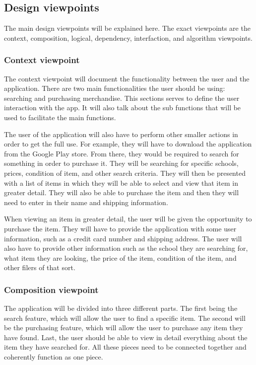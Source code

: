 \documentclass[journal,compsoc, 10pt, draftclsnofoot, onecolumn]{IEEEtran}
\begin{document}
\subsection{Design viewpoints}
The main design viewpoints will be explained here. The exact viewpoints are the 
context, composition, logical, dependency, interfaction, and algorithm viewpoints.

\subsubsection{Context viewpoint}
The context viewpoint will document the functionality between the user and the 
application. There are two main functionalities the user should be using: 
searching and purchasing merchandise. This sections serves to define the user 
interaction with the app. It will also talk about the sub functions that will 
be used to facilitate the main functions. \newline

The user of the application will also have to perform other smaller actions in 
order to get the full use. For example, they will have to download the application 
from the Google Play store. From there, they would be required to search for 
something in order to purchase it. They will be searching for specific schools, 
prices, condition of item, and other search criteria. They will then be presented 
with a list of items in which they will be able to select and view that item in 
greater detail. They will also be able to purchase the item and then they will 
need to enter in their name and shipping information. \newline

When viewing an item in greater detail, the user will be given the opportunity 
to purchase the item. They will have to provide the application with some user 
information, such as a credit card number and shipping address. The user will 
also have to provide other information such as the school they are searching 
for, what item they are looking, the price of the item, condition of the item, 
and other filers of that sort.

\subsubsection{Composition viewpoint}
The application will be divided into three different parts. The first being the 
search feature, which will allow the user to find a specific item. The second 
will be the purchasing feature, which will allow the user to purchase any item 
they have found. Last, the user should be able to view in detail everything 
about the item they have searched for. All these pieces need to be connected 
together and coherently function as one piece. 
\end{document}
